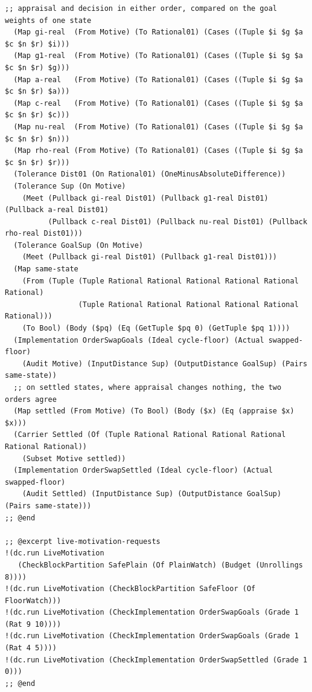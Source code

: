 \documentclass[11pt]{article}
\theoremstyle{definition}
\theoremstyle{plain}
\begin{document}
\begin{lstlisting}[style=mettafull]
  ;; appraisal and decision in either order, compared on the goal weights of one state
  (Map gi-real  (From Motive) (To Rational01) (Cases ((Tuple $i $g $a $c $n $r) $i)))
  (Map g1-real  (From Motive) (To Rational01) (Cases ((Tuple $i $g $a $c $n $r) $g)))
  (Map a-real   (From Motive) (To Rational01) (Cases ((Tuple $i $g $a $c $n $r) $a)))
  (Map c-real   (From Motive) (To Rational01) (Cases ((Tuple $i $g $a $c $n $r) $c)))
  (Map nu-real  (From Motive) (To Rational01) (Cases ((Tuple $i $g $a $c $n $r) $n)))
  (Map rho-real (From Motive) (To Rational01) (Cases ((Tuple $i $g $a $c $n $r) $r)))
  (Tolerance Dist01 (On Rational01) (OneMinusAbsoluteDifference))
  (Tolerance Sup (On Motive)
    (Meet (Pullback gi-real Dist01) (Pullback g1-real Dist01) (Pullback a-real Dist01)
          (Pullback c-real Dist01) (Pullback nu-real Dist01) (Pullback rho-real Dist01)))
  (Tolerance GoalSup (On Motive)
    (Meet (Pullback gi-real Dist01) (Pullback g1-real Dist01)))
  (Map same-state
    (From (Tuple (Tuple Rational Rational Rational Rational Rational Rational)
                 (Tuple Rational Rational Rational Rational Rational Rational)))
    (To Bool) (Body ($pq) (Eq (GetTuple $pq 0) (GetTuple $pq 1))))
  (Implementation OrderSwapGoals (Ideal cycle-floor) (Actual swapped-floor)
    (Audit Motive) (InputDistance Sup) (OutputDistance GoalSup) (Pairs same-state))
  ;; on settled states, where appraisal changes nothing, the two orders agree
  (Map settled (From Motive) (To Bool) (Body ($x) (Eq (appraise $x) $x)))
  (Carrier Settled (Of (Tuple Rational Rational Rational Rational Rational Rational))
    (Subset Motive settled))
  (Implementation OrderSwapSettled (Ideal cycle-floor) (Actual swapped-floor)
    (Audit Settled) (InputDistance Sup) (OutputDistance GoalSup) (Pairs same-state)))
;; @end

;; @excerpt live-motivation-requests
!(dc.run LiveMotivation
   (CheckBlockPartition SafePlain (Of PlainWatch) (Budget (Unrollings 8))))
!(dc.run LiveMotivation (CheckBlockPartition SafeFloor (Of FloorWatch)))
!(dc.run LiveMotivation (CheckImplementation OrderSwapGoals (Grade 1 (Rat 9 10))))
!(dc.run LiveMotivation (CheckImplementation OrderSwapGoals (Grade 1 (Rat 4 5))))
!(dc.run LiveMotivation (CheckImplementation OrderSwapSettled (Grade 1 0)))
;; @end


\end{lstlisting}
\end{document}
